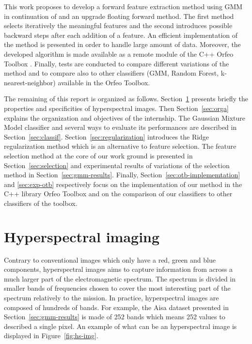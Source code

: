 \documentclass[a4paper,11pt,DIV=16,abstracton]{scrartcl}
\begin{document}
This work proposes to develop a forward feature extraction method using GMM in continuation of \cite{fauvel2015fast} and an upgrade floating forward method. The first method selects iteratively the meaningful features and the second introduces possible backward steps after each addition of a feature. An efficient implementation of the method is presented in order to handle large amount of data. Moreover, the developed algorithm is made available as a remote module of the C++ Orfeo Toolbox \cite{christophe2008orfeo}. Finally, tests are conducted to compare different variations of the method and to compare also to other classifiers (GMM, Random Forest, k-nearest-neighbor) available in the Orfeo Toolbox.

The remaining of this report is organized as follows. Section~\ref{sec:hs-img} presents briefly the properties and specificities of hyperspectral images. Then Section~\ref{sec:orga} explains the organization and objectives of the internship. The Gaussian Mixture Model classifier and several ways to evaluate its performances are described in Section~\ref{sec:classif}. Section~\ref{sec:regularization} introduces the Ridge regularization method which is an alternative to feature selection. The feature selection method at the core of our work ground is presented in Section~\ref{sec:selection} and experimental results of variations of the selection method in Section~\ref{sec:gmm-results}. Finally, Section~\ref{sec:otb-implememtation} and \ref{sec:exp-otb} respectively focus on the implementation of our method in the C++ library Orfeo Toolbox and on the comparison of our classifiers to other classifiers of the toolbox.

\section{Hyperspectral imaging}
\label{sec:hs-img}

Contrary to conventional images which only have a red, green and blue components, hyperspectral images aims to capture information from across a much larger part of the electromagnetic spectrum. The spectrum is divided in smaller bands of frequencies chosen to cover the most interesting part of the spectrum relatively to the mission. In practice, hyperspectral images are composed of hundreds of bands. For example, the Aisa dataset presented in Section~\ref{sec:gmm-results} is made of 252 bands which means 252 values to described a single pixel. An example of what can be an hyperspectral image is displayed in Figure~\ref{fig:hs-img}.
\end{document}
